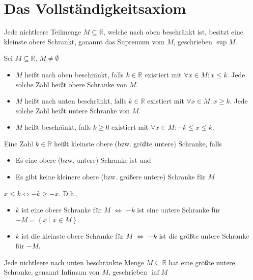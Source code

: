 \section{Das Vollständigkeitsaxiom}
\begin{axiom}[Vollständigkeitsaxiom]
  Jede nichtleere Teilmenge $M \subseteq \mathbb{R}$, welche nach oben beschränkt ist, besitzt eine kleinste obere Schrankt, ganannt das Supremum vom $M$, geschrieben $\operatorname{sup} M$.
\end{axiom}

\begin{definition}
  Sei $M \subseteq \mathbb{R}$, $M \ne \emptyset$
  \begin{itemize}
  \item $M$ heißt nach oben beschränkt, falls $k \in \mathbb{R}$ existiert mit $\forall x \in M: x \le k$. Jede solche Zahl heißt obere Schranke von $M$.
  \item $M$ heißt nach unten beschränkt, falls $k \in \mathbb{R}$ existiert mit $\forall x \in M: x \ge k$. Jede solche Zahl heißt untere Schranke von $M$.
  \item $M$ heißt beschränkt, falls $k \ge 0$ existiert mit $\forall x \in M: -k \le x \le k$.
  \end{itemize}
\end{definition}
\begin{definition}
  Eine Zahl $k \in \mathbb{R}$ heißt kleinste obere (bzw. größte untere) Schranke, falls
  \begin{itemize}
  \item Es eine obere (bzw. untere) Schranke ist und
  \item Es gibt keine kleinere obere (bzw. größere untere) Schranke für $M$
  \end{itemize}
\end{definition}
\begin{remark}
  $x \le k \iff -k \ge -x$. D.h.,
  \begin{itemize}
  \item $k$ ist eine obere Schranke für $M$ $\iff$ $-k$ ist eine untere Schranke für $-M = \left\{ x \middle| x \in M \right\}$.
  \item $k$ ist die kleinste obere Schranke für $M$ $\iff$ $-k$ ist die größte untere Schranke für $-M$.
  \end{itemize}

  Jede nichtleere nach unten beschränkte Menge $M \subseteq \mathbb{R}$ hat eine größte untere Schranke, genannt Infimum von $M$, geschrieben $\operatorname{inf} M$
\end{remark}
